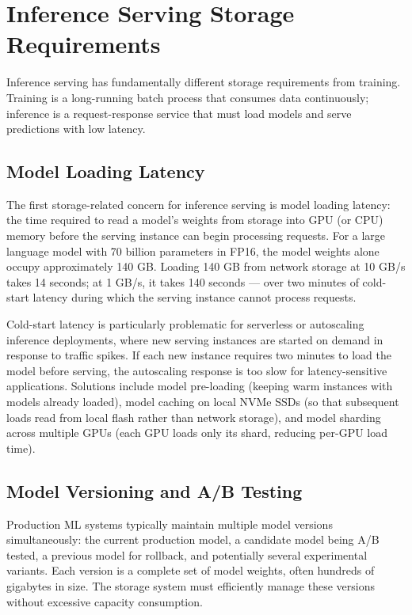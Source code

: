 \section{Inference Serving Storage Requirements}

Inference serving has fundamentally different storage requirements from training. Training is a long-running batch process that consumes data continuously; inference is a request-response service that must load models and serve predictions with low latency.

\subsection{Model Loading Latency}

The first storage-related concern for inference serving is model loading latency: the time required to read a model's weights from storage into GPU (or CPU) memory before the serving instance can begin processing requests. For a large language model with 70 billion parameters in FP16, the model weights alone occupy approximately 140 GB. Loading 140 GB from network storage at 10 GB/s takes 14 seconds; at 1 GB/s, it takes 140 seconds --- over two minutes of cold-start latency during which the serving instance cannot process requests.

Cold-start latency is particularly problematic for serverless or autoscaling inference deployments, where new serving instances are started on demand in response to traffic spikes. If each new instance requires two minutes to load the model before serving, the autoscaling response is too slow for latency-sensitive applications. Solutions include model pre-loading (keeping warm instances with models already loaded), model caching on local NVMe SSDs (so that subsequent loads read from local flash rather than network storage), and model sharding across multiple GPUs (each GPU loads only its shard, reducing per-GPU load time).

\subsection{Model Versioning and A/B Testing}

Production ML systems typically maintain multiple model versions simultaneously: the current production model, a candidate model being A/B tested, a previous model for rollback, and potentially several experimental variants. Each version is a complete set of model weights, often hundreds of gigabytes in size. The storage system must efficiently manage these versions without excessive capacity consumption.

